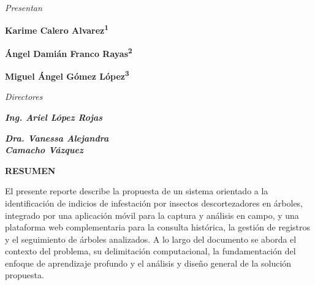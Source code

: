\begin{titlepage}
\begin{center}
        \vspace{1.3 cm}

       {\fontsize{14}{17}\selectfont\itshape Presentan\par}
       \vspace{0.2cm}
        {\fontsize{14}{17}\selectfont\bfseries Karime Calero Alvarez\textsuperscript{1}\par}
        \vspace{0.2cm}
        {\fontsize{14}{17}\selectfont\bfseries Ángel Damián Franco Rayas\textsuperscript{2}\par}
        \vspace{0.2cm}
        {\fontsize{14}{17}\selectfont\bfseries Miguel Ángel Gómez López\textsuperscript{3}\par}

        \vspace{1.3 cm}

        {\fontsize{14}{17}\selectfont\itshape Directores\par}

        \vspace{1.0cm}

        \begin{minipage}{0.42\textwidth}
            \centering
            {\fontsize{13}{16}\selectfont\bfseries\itshape Ing. Ariel López Rojas \par}
        \end{minipage}
        \hfill
        \begin{minipage}{0.42\textwidth}
            \centering
            {\fontsize{13}{16}\selectfont\bfseries\itshape Dra. Vanessa Alejandra\\Camacho Vázquez\par}
        \end{minipage}

        \vspace{1.0cm}

        {\fontsize{16}{19}\selectfont\bfseries RESUMEN\par}
    \end{center}

    \vspace{0.3cm}

    \noindent
    {\fontsize{12}{15}\selectfont
    El presente reporte describe la propuesta de un sistema orientado a la identificación de indicios de infestación por insectos descortezadores en árboles, integrado por una aplicación móvil para la captura y análisis en campo, y una plataforma web complementaria para la consulta histórica, la gestión de registros y el seguimiento de árboles analizados. A lo largo del documento se aborda el contexto del problema, su delimitación computacional, la fundamentación del enfoque de aprendizaje profundo y el análisis y diseño general de la solución propuesta.
    \par}


\end{titlepage}
